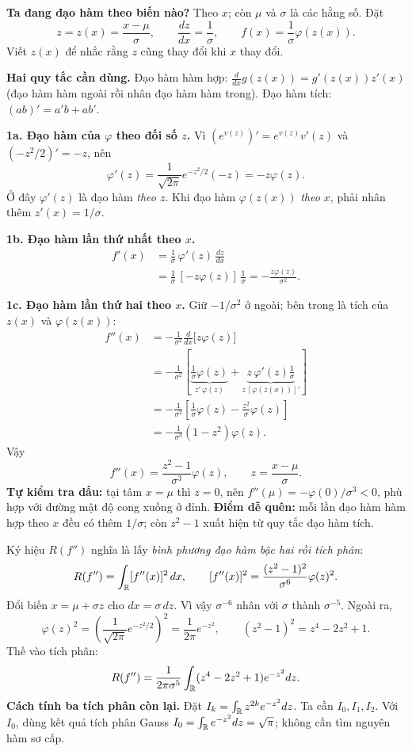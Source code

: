 \textbf{Ta đang đạo hàm theo biến nào?} Theo $x$; còn $\mu$ và $\sigma$
là các hằng số. Đặt
\[
z=z(x)=\frac{x-\mu}{\sigma},\qquad
\frac{dz}{dx}=\frac1\sigma,\qquad
f(x)=\frac1\sigma\varphi(z(x)).
\]
Viết $z(x)$ để nhắc rằng $z$ cũng thay đổi khi $x$ thay đổi.

\textbf{Hai quy tắc cần dùng.}
Đạo hàm hàm hợp: $\frac{d}{dx}g(z(x))=g'(z(x))z'(x)$
(đạo hàm hàm ngoài rồi nhân đạo hàm hàm trong).
Đạo hàm tích: $(ab)'=a'b+ab'$.

\textbf{1a. Đạo hàm của $\varphi$ theo đối số $z$.}
Vì $(e^{v(z)})'=e^{v(z)}v'(z)$ và $(-z^2/2)'=-z$, nên
\[
\varphi'(z)
=\frac1{\sqrt{2\pi}}e^{-z^2/2}(-z)
=-z\varphi(z).
\]
Ở đây $\varphi'(z)$ là đạo hàm \emph{theo $z$}.
Khi đạo hàm $\varphi(z(x))$ \emph{theo $x$}, phải nhân thêm $z'(x)=1/\sigma$.

\textbf{1b. Đạo hàm lần thứ nhất theo $x$.}
\begin{align*}
f'(x)
&=\frac1\sigma\,\varphi'(z)\,\frac{dz}{dx}\\
&=\frac1\sigma\,[-z\varphi(z)]\,\frac1\sigma
=-\frac{z\varphi(z)}{\sigma^2}.
\end{align*}

\textbf{1c. Đạo hàm lần thứ hai theo $x$.}
Giữ $-1/\sigma^2$ ở ngoài; bên trong là tích của $z(x)$ và $\varphi(z(x))$:
\begin{align*}
f''(x)
&=-\frac1{\sigma^2}\frac{d}{dx}\bigl[z\varphi(z)\bigr]\\
&=-\frac1{\sigma^2}
  \left[\underbrace{\frac1\sigma\varphi(z)}_{z'\,\varphi(z)}
  +\underbrace{z\,\varphi'(z)\frac1\sigma}_{z\,[\varphi(z(x))]'}\right]\\
&=-\frac1{\sigma^2}
  \left[\frac1\sigma\varphi(z)-\frac{z^2}{\sigma}\varphi(z)\right]\\
&=-\frac1{\sigma^3}(1-z^2)\varphi(z).
\end{align*}
Vậy
\[
\boxed{f''(x)=\frac{z^2-1}{\sigma^3}\varphi(z),
\qquad z=\frac{x-\mu}{\sigma}.}
\]
\textbf{Tự kiểm tra dấu:} tại tâm $x=\mu$ thì $z=0$, nên
$f''(\mu)=-\varphi(0)/\sigma^3<0$, phù hợp với đường mật độ cong xuống ở đỉnh.
\textbf{Điểm dễ quên:} mỗi lần đạo hàm hàm hợp theo $x$ đều có thêm
$1/\sigma$; còn $z^2-1$ xuất hiện từ quy tắc đạo hàm tích.

Ký hiệu $R(f'')$ nghĩa là lấy \emph{bình phương đạo hàm bậc hai rồi tích phân}:
\[
R(f'')=\int_{\mathbb R}[f''(x)]^2\,dx,
\qquad [f''(x)]^2=\frac{(z^2-1)^2}{\sigma^6}\varphi(z)^2.
\]
Đổi biến $x=\mu+\sigma z$ cho $dx=\sigma\,dz$.
Vì vậy $\sigma^{-6}$ nhân với $\sigma$ thành $\sigma^{-5}$.
Ngoài ra,
\[
\varphi(z)^2=\left(\frac1{\sqrt{2\pi}}e^{-z^2/2}\right)^2
=\frac1{2\pi}e^{-z^2},\qquad (z^2-1)^2=z^4-2z^2+1.
\]
Thế vào tích phân:
\[
R(f'')=\frac1{2\pi\sigma^5}\int_{\mathbb R}(z^4-2z^2+1)e^{-z^2}dz.
\]
\textbf{Cách tính ba tích phân còn lại.}
Đặt $I_k=\int_{\mathbb R}z^{2k}e^{-z^2}dz$. Ta cần $I_0,I_1,I_2$.
Với $I_0$, dùng kết quả tích phân Gauss
$I_0=\int_{\mathbb R}e^{-z^2}dz=\sqrt\pi$; không cần tìm nguyên hàm sơ cấp.

